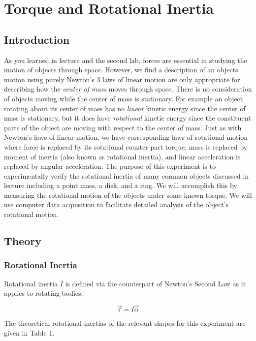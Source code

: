 \chapter{Torque and Rotational Inertia}
\label{chap:torque}
\section{Introduction}
As you learned in lecture and the second lab, forces are essential in studying the motion of objects through space. However, we find a description of an objects motion using purely Newton's 3 laws of linear motion are only appropriate for describing how the {\it{center of mass}} moves through space. There is no consideration of objects moving while the center of mass is stationary. For example an object rotating about its center of mass has no {\it{linear}} kinetic energy since the center of mass is stationary, but it does have {\it{rotational}} kinetic energy since the constituent parts of the object are moving with respect to the center of mass. Just as with Newton's laws of linear motion, we have corresponding laws of rotational motion where force is replaced by its rotational counter part torque, mass is replaced by moment of inertia (also known as rotational inertia), and linear acceleration is replaced by angular acceleration. The purpose of this experiment is to experimentally verify the rotational inertia of many common objects discussed in lecture including a point mass, a disk, and a ring. We will accomplish this by measuring the rotational motion of the objects under some known torque. We will use computer data acquisition to facilitate detailed analysis of the object's rotational motion.

\section{Theory}
\subsection{Rotational Inertia}
Rotational inertia $I$ is defined via the counterpart of Newton's Second Law as it applies to rotating bodies,

\begin{equation}
\vec \tau = I \vec \alpha
\end{equation}

  The theoretical rotational inertias of the relevant shapes for this experiment are given in Table 1.\myskip

